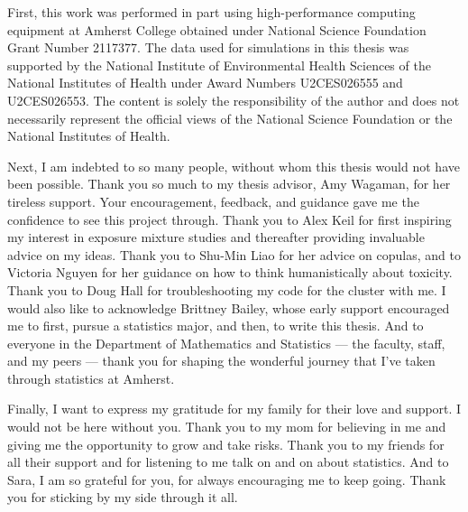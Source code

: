 \documentclass[12pt, twoside]{amherstthesis}
\begin{document}
  \begin{acknowledgments}
    First, this work was performed in part using high-performance computing equipment at Amherst College obtained under National Science Foundation Grant Number 2117377. The data used for simulations in this thesis was supported by the National Institute of Environmental Health Sciences of the National Institutes of Health under Award Numbers U2CES026555 and U2CES026553. The content is solely the responsibility of the author and does not necessarily represent the official views of the National Science Foundation or the National Institutes of Health.

    Next, I am indebted to so many people, without whom this thesis would not have been possible. Thank you so much to my thesis advisor, Amy Wagaman, for her tireless support. Your encouragement, feedback, and guidance gave me the confidence to see this project through. Thank you to Alex Keil for first inspiring my interest in exposure mixture studies and thereafter providing invaluable advice on my ideas. Thank you to Shu-Min Liao for her advice on copulas, and to Victoria Nguyen for her guidance on how to think humanistically about toxicity. Thank you to Doug Hall for troubleshooting my code for the cluster with me. I would also like to acknowledge Brittney Bailey, whose early support encouraged me to first, pursue a statistics major, and then, to write this thesis. And to everyone in the Department of Mathematics and Statistics --- the faculty, staff, and my peers --- thank you for shaping the wonderful journey that I've taken through statistics at Amherst.

    Finally, I want to express my gratitude for my family for their love and support. I would not be here without you. Thank you to my mom for believing in me and giving me the opportunity to grow and take risks. Thank you to my friends for all their support and for listening to me talk on and on about statistics. And to Sara, I am so grateful for you, for always encouraging me to keep going. Thank you for sticking by my side through it all.
  \end{acknowledgments}

  \hypersetup{linkcolor=black}
  \setcounter{tocdepth}{2}
  \tableofcontents

  \listoftables

  \listoffigures


\mainmatter %
\pagestyle{fancyplain} %
\end{document}

